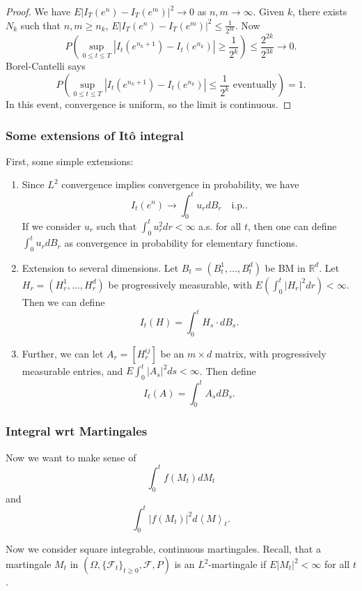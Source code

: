 \begin{proof}
	We have $E \left| I_T(e^n) - I_T(e^m) \right| ^2 \to 0$ as $n , m \to  \infty $. Given $k$, there exists $N_k$ such that $n, m \ge n_k$, $E \left| I_T(e^n) - I_T(e^m) \right| ^2 \le  \frac{1}{2^{3k}}$. Now
\[
		P\left( \sup _{0 \le t\le T} \left| I_t(e^{n_k + 1}) - I_t(e^{n_k}) \right| \ge \frac{1}{2^k} \right) 
		\le \frac{2^{2k}}{2^{3k}} \to  0 
	.\]
	Borel-Cantelli says 
	\[
		P\left( \sup _{0 \le t\le T} \left| I_t(e^{n_k + 1}) - I_t(e^{n_k}) \right| \le \frac{1}{2^k} \text{ eventually}\right)  = 1
	.\] 
	In this event, convergence is uniform, so the limit is continuous.
\end{proof}

\subsubsection{Some extensions of Itô integral}

First, some simple extensions:
\begin{enumerate}
	\item Since $L^2 $ convergence implies convergence in probability, we have
		\[
			I_t(e^n) \to  \int _0^t u_r d B_r \quad \text{i.p.}
		.\] 
		If we consider $u_r$ such that $\int _0^t u_r^2 dr < \infty $ a.s. for all $t$, then one can define $\int _0^t u_r d B_r$ as convergence in probability for elementary functions.
	\item Extension to several dimensions. Let $B_t = \left( B_t^1, \ldots, B_t^d \right) $ be BM in $\mathbb{R}^d$. Let $H_r = \left( H_r^1, \ldots, H_r^d \right) $ be progressively measurable, with $E\left( \int _0^t \left| H_r \right| ^2 dr  \right) < \infty $. Then we can define
		\[
			I_t(H) = \int _0^t H_s \cdot d B_s
		.\] 
	\item Further, we can let $A_r = \left[ H_r^{ij } \right] $ be an $m \times d$ matrix, with progressively measurable entries, and $E \int _0^t \left| A_s \right| ^2 ds < \infty $. Then define
		\[
			I_t(A) = \int _0^t A_s d B_s
		.\] 
\end{enumerate}

\subsubsection{Integral wrt Martingales}



Now we want to make sense of
\[
	\int _0^t f(M_t) d M_t
\] 
and
\[
	\int _0^t \left| f(M_t) \right|^2 d \left\langle M \right\rangle _t 
.\] 

Now we consider square integrable, continuous martingales. 
Recall, that a martingale $M_t$ in $(\Omega, \{\mathcal{F}_t\} _{t \ge 0}, \mathcal{F}, P)$ is an $L^2  $-martingale if $E|M_t|^2 < \infty $ for all $t$.

